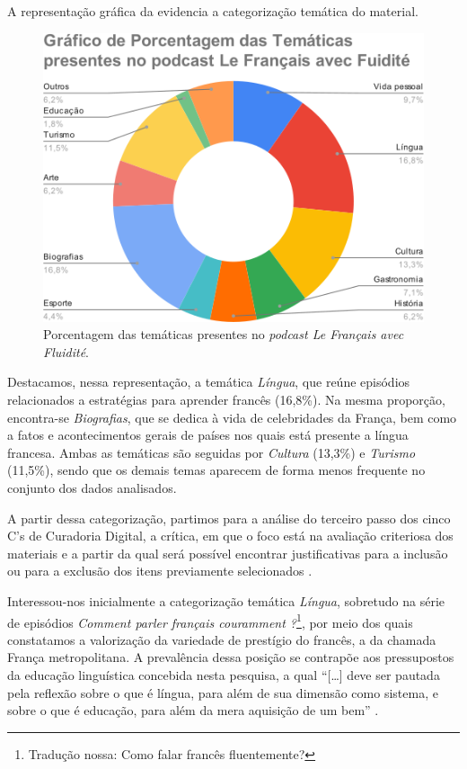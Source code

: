 \documentclass[portuguese]{textolivre}
\begin{document}
A representação gráfica da  evidencia a categorização temática do material.

\begin{figure}[h]
    \centering
    \begin{minipage}{.55\textwidth}
    \includegraphics[width=\linewidth]{Fig1.png}
    \caption{Porcentagem das temáticas presentes no \textit{podcast Le Français avec Fluidité}.}
    \label{fig1}
    \end{minipage}
\end{figure}

Destacamos, nessa representação, a temática \textit{Língua}, que reúne episódios relacionados a estratégias para aprender francês (16,8\%). Na mesma proporção, encontra-se \textit{Biografias}, que se dedica à vida de celebridades da França, bem como a fatos e acontecimentos gerais de países nos quais está presente a língua francesa. Ambas as temáticas são seguidas por \textit{Cultura} (13,3\%) e \textit{Turismo} (11,5\%), sendo que os demais temas aparecem de forma menos frequente no conjunto dos dados analisados.

A partir dessa categorização, partimos para a análise do terceiro passo dos cinco C’s de Curadoria Digital, a crítica, em que o foco está na avaliação criteriosa dos materiais e a partir da qual será possível encontrar justificativas para a inclusão ou para a exclusão dos itens previamente selecionados \cite{deschaine_five_2015}. 

Interessou-nos inicialmente a categorização temática \textit{Língua}, sobretudo na série de episódios \textit{Comment parler français couramment ?}\footnote{Tradução nossa: Como falar francês fluentemente?}, por meio dos quais constatamos a valorização da variedade de prestígio do francês, a da chamada França metropolitana. A prevalência dessa posição se contrapõe aos pressupostos da educação linguística concebida nesta pesquisa, a qual “[…] deve ser pautada pela reflexão sobre o que é língua, para além de sua dimensão como sistema, e sobre o que é educação, para além da mera aquisição de um bem” \cite{grilli_por_2021}.
\end{document}

